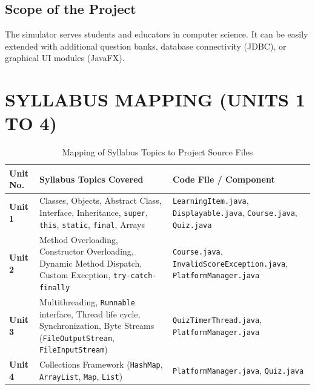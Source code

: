 \documentclass[12pt,a4paper]{article}
\begin{document}
\subsection{Scope of the Project}
The simulator serves students and educators in computer science. It can be easily extended with additional question banks, database connectivity (JDBC), or graphical UI modules (JavaFX).

\section{SYLLABUS MAPPING (UNITS 1 TO 4)}

\begin{table}[H]
    \centering
    \small
    \begin{tabularx}{\textwidth}{l p{7.5cm} X}
        \toprule
        \textbf{Unit No.} & \textbf{Syllabus Topics Covered} & \textbf{Code File / Component} \\
        \midrule
        \textbf{Unit 1} & Classes, Objects, Abstract Class, Interface, Inheritance, \texttt{super}, \texttt{this}, \texttt{static}, \texttt{final}, Arrays & \texttt{LearningItem.java}, \texttt{Displayable.java}, \texttt{Course.java}, \texttt{Quiz.java} \\
        \addlinespace
        \textbf{Unit 2} & Method Overloading, Constructor Overloading, Dynamic Method Dispatch, Custom Exception, \texttt{try-catch-finally} & \texttt{Course.java}, \texttt{InvalidScoreException.java}, \texttt{PlatformManager.java} \\
        \addlinespace
        \textbf{Unit 3} & Multithreading, \texttt{Runnable} interface, Thread life cycle, Synchronization, Byte Streams (\texttt{FileOutputStream}, \texttt{FileInputStream}) & \texttt{QuizTimerThread.java}, \texttt{PlatformManager.java} \\
        \addlinespace
        \textbf{Unit 4} & Collections Framework (\texttt{HashMap}, \texttt{ArrayList}, \texttt{Map}, \texttt{List}) & \texttt{PlatformManager.java}, \texttt{Quiz.java} \\
        \bottomrule
    \end{tabularx}
    \caption{Mapping of Syllabus Topics to Project Source Files}
\end{table}

\end{document}
